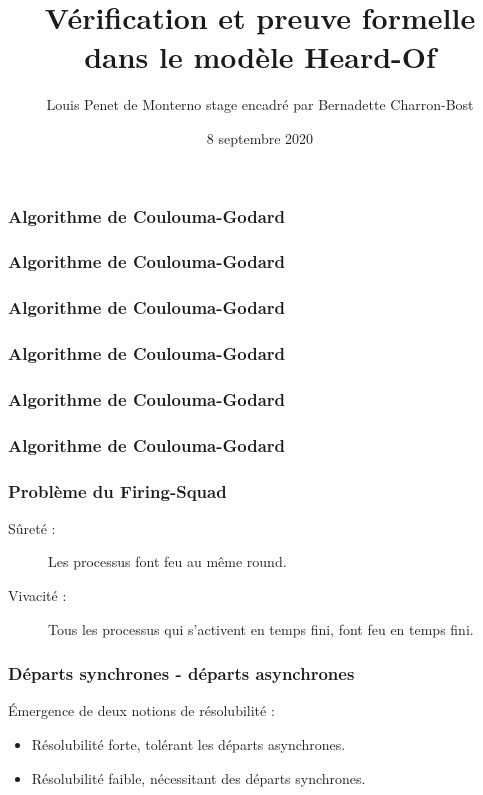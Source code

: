 \documentclass{beamer}
\title{Vérification et preuve formelle dans le modèle Heard-Of}
\date{8 septembre 2020}
\author{Louis Penet de Monterno \linebreak \scriptsize{stage encadré par Bernadette Charron-Bost}}
\institute{LIX}
\begin{document}
\begin{frame}
\frametitle{Algorithme de Coulouma-Godard}
\end{frame}

\begin{frame}
\frametitle{Algorithme de Coulouma-Godard}
\end{frame}
\begin{frame}
\frametitle{Algorithme de Coulouma-Godard}
\end{frame}
\begin{frame}
\frametitle{Algorithme de Coulouma-Godard}
\end{frame}
\begin{frame}
\frametitle{Algorithme de Coulouma-Godard}
\end{frame}
\begin{frame}
\frametitle{Algorithme de Coulouma-Godard}
\end{frame}
\begin{frame}
\frametitle{Problème du Firing-Squad}
	\begin{description}
	   \item[Sûreté : ] Les processus font feu au même round.
	   \item[Vivacité : ] Tous les processus qui s'activent en temps fini, font feu en temps fini. 
	\end{description}

\end{frame}
\begin{frame}
\frametitle{Départs synchrones - départs asynchrones}
Émergence de deux notions de résolubilité :
	\begin{itemize}
		\item Résolubilité forte, tolérant les départs asynchrones.
		\item Résolubilité faible, nécessitant des départs synchrones.
	\end{itemize}
\end{frame}
\end{document}
